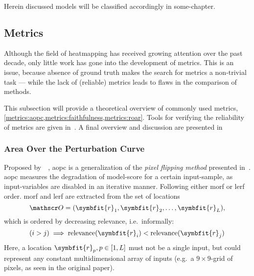 Herein discussed models will be classified accordingly in some-chapter. 

\subsection{Metrics}
Although the field of heatmapping has received growing attention over the past decade, only little work has gone into the development of metrics. This is an issue, because absence of ground truth makes the search for metrics a non-trivial task --- while the lack of (reliable) metrics leads to flaws in the comparison of methods.

This subsection will provide a theoretical overview of commonly used metrics, \cref{metrics:aopc,metrics:faithfulness,metrics:roar}. Tools for verifying the reliability of metrics are given in~. A final overview and discussion are presented in~

\subsubsection{Area Over the Perturbation Curve}\label{metrics:aopc} Proposed by~\citeauthor{WojciechSamek.2015}~\cite{WojciechSamek.2015}, \gls{aopc} is a generalization of the \textit{pixel flipping method} presented in~\cite[pp. 34ff.]{Bach.2015}. \gls{aopc} measures the degradation of model-score for a certain input-sample, as input-variables are disabled in an iterative manner. Following either \gls{morf} or \gls{lerf} order. \gls{morf} and \gls{lerf} are extracted from the set of locations \[ \mathscr O = (\symbfit{r}_1, \symbfit{r}_2, \dots, \symbfit{r}_L), \]  which is ordered by decreasing relevance, i.e.\ informally: \[(i > j) \implies \text{relevance}(\symbfit{r}_i) < \text{relevance}(\symbfit{r}_j) \] Here, a location \( \symbfit{r}_p, p \in [1, L] \) must not be a single input, but could represent any constant multidimensional array of inputs (e.g.\ a \( 9\times9 \)-grid of pixels, as seen in the original paper).

